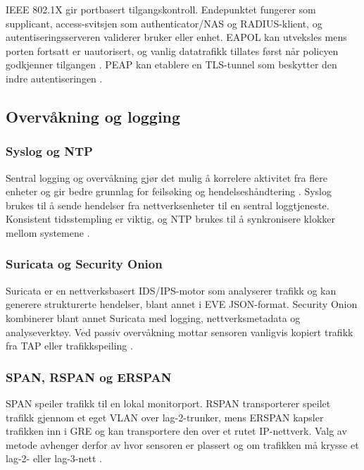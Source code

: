 IEEE 802.1X gir portbasert tilgangskontroll. Endepunktet fungerer som supplicant, access-svitsjen som authenticator/NAS og RADIUS-klient, og autentiseringsserveren validerer bruker eller enhet. EAPOL kan utveksles mens porten fortsatt er uautorisert, og vanlig datatrafikk tillates først når policyen godkjenner tilgangen \cite{rfc3580,cisco_wired_dot1x}. PEAP kan etablere en TLS-tunnel som beskytter den indre autentiseringen \cite{ms_peap}.

\subsection{Overvåkning og logging}

\subsubsection{Syslog og NTP}

Sentral logging og overvåkning gjør det mulig å korrelere aktivitet fra flere enheter og gir bedre grunnlag for feilsøking og hendelseshåndtering \cite{nsm_n03}. Syslog brukes til å sende hendelser fra nettverksenheter til en sentral loggtjeneste. Konsistent tidsstempling er viktig, og NTP brukes til å synkronisere klokker mellom systemene \cite{nsm_n03}.

\subsubsection{Suricata og Security Onion}

Suricata er en nettverksbasert IDS/IPS-motor som analyserer trafikk og kan generere strukturerte hendelser, blant annet i EVE JSON-format. Security Onion kombinerer blant annet Suricata med logging, nettverksmetadata og analyseverktøy. Ved passiv overvåkning mottar sensoren vanligvis kopiert trafikk fra TAP eller trafikkspeiling \cite{suricata_eve,security_onion_intro}.

\subsubsection{SPAN, RSPAN og ERSPAN}

SPAN speiler trafikk til en lokal monitorport. RSPAN transporterer speilet trafikk gjennom et eget VLAN over lag-2-trunker, mens ERSPAN kapsler trafikken inn i GRE og kan transportere den over et rutet IP-nettverk. Valg av metode avhenger derfor av hvor sensoren er plassert og om trafikken må krysse et lag-2- eller lag-3-nett \cite{cisco_span_rspan_3850,cisco_erspan_3850}.

